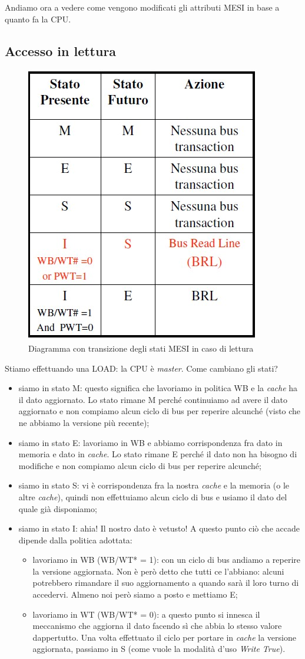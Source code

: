 Andiamo ora a vedere come vengono modificati gli attributi MESI in base a quanto fa la CPU.

\subsection{Accesso in lettura}
\label{sec:accessoLettura}

\begin{figure}[!h]
\centering
\includegraphics[width=0.35\columnwidth]{img/transLettura}
\caption{Diagramma con transizione degli stati MESI in caso di lettura}
\label{fig:transLettura}
\end{figure}

Stiamo effettuando una LOAD: la CPU è \textit{master}. Come cambiano gli stati?

\begin{itemize}
\item siamo in stato M: questo significa che lavoriamo in politica WB e la \textit{cache} ha il dato aggiornato. Lo stato rimane M perché continuiamo ad avere il dato aggiornato e non compiamo alcun ciclo di bus per reperire alcunché (visto che ne abbiamo la versione più recente);
\item siamo in stato E: lavoriamo in WB e abbiamo corrispondenza fra dato in memoria e dato in\textit{ cache}. Lo stato rimane E perché il dato non ha bisogno di modifiche e non compiamo alcun ciclo di bus per reperire alcunché;
\item siamo in stato S: vi è corrispondenza fra la nostra \textit{cache} e la memoria (o le altre \textit{cache}), quindi non effettuiamo alcun ciclo di bus e usiamo il dato del quale già disponiamo;
\item siamo in stato I: ahia! Il nostro dato è vetusto! A questo punto ciò che accade dipende dalla politica adottata:
\begin{itemize}
\item lavoriamo in WB (WB/WT* = 1): con un ciclo di bus andiamo a reperire la versione aggiornata. Non è però detto che tutti ce l'abbiano: alcuni potrebbero rimandare il suo aggiornamento a quando sarà il loro turno di accedervi. Almeno noi però siamo a posto e mettiamo E;
\item lavoriamo in WT (WB/WT* = 0): a questo punto si innesca il meccanismo che aggiorna il dato facendo sì che abbia lo stesso valore dappertutto. Una volta effettuato il ciclo per portare in \textit{cache} la versione aggiornata, passiamo in S (come vuole la modalità d'uso \textit{Write True}).
\end{itemize}
\end{itemize}

